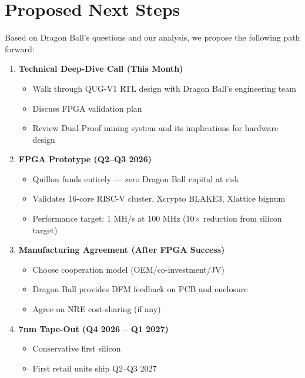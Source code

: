 \documentclass[11pt,a4paper]{article}
\begin{document}
\section{Proposed Next Steps}

Based on Dragon Ball's questions and our analysis, we propose the following path forward:

\begin{enumerate}[leftmargin=1.5em]
    \item \textbf{Technical Deep-Dive Call (This Month)}
    \begin{itemize}
        \item Walk through QUG-V1 RTL design with Dragon Ball's engineering team
        \item Discuss FPGA validation plan
        \item Review Dual-Proof mining system and its implications for hardware design
    \end{itemize}

    \item \textbf{FPGA Prototype (Q2--Q3 2026)}
    \begin{itemize}
        \item Quillon funds entirely --- zero Dragon Ball capital at risk
        \item Validates 16-core RISC-V cluster, Xcrypto BLAKE3, Xlattice bignum
        \item Performance target: 1 MH/s at 100 MHz (10$\times$ reduction from silicon target)
    \end{itemize}

    \item \textbf{Manufacturing Agreement (After FPGA Success)}
    \begin{itemize}
        \item Choose cooperation model (OEM/co-investment/JV)
        \item Dragon Ball provides DFM feedback on PCB and enclosure
        \item Agree on NRE cost-sharing (if any)
    \end{itemize}

    \item \textbf{7nm Tape-Out (Q4 2026 -- Q1 2027)}
    \begin{itemize}
        \item Conservative first silicon
        \item First retail units ship Q2--Q3 2027
    \end{itemize}
\end{enumerate}
\end{document}
